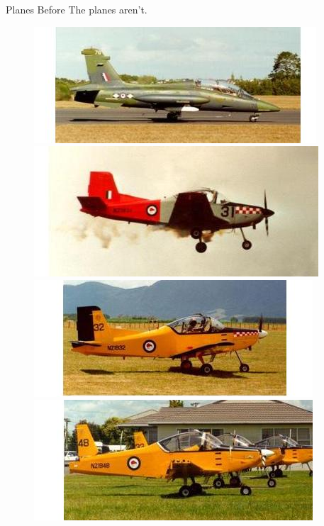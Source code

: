 \documentclass{beamer}
\begin{document}
\begin{frame}{Planes Before}
  The planes aren't.
  \begin{figure}
    \centering
    \includegraphics[scale=.4]{airplane-image_0001.jpg}
    \includegraphics[scale=.4]{airplane-image_0002.jpg} \\
    \includegraphics[scale=.4]{airplane-image_0003.jpg}
    \includegraphics[scale=.4]{airplane-image_0004.jpg}
  \end{figure}
\end{frame}
\end{document}
